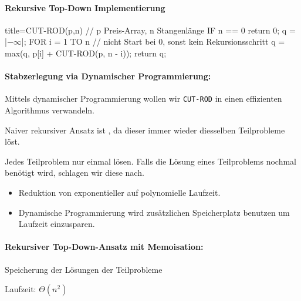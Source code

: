 \documentclass[
    ngerman,
    color=3b,
    load_common, %
    summary,
    boxarc,
]{rubos-tuda-template}
\begin{document}
\paragraph{Rekursive Top-Down Implementierung}\mbox{}

\begin{codeBlock}[autogobble,escapeinside=||]{title={CUT-ROD(p,n)    // p Preis-Array, n Stangenlänge}}
    IF n == 0
        return 0;
    q = |$-\infty$|;
    FOR i = 1 TO n  // nicht Start bei 0, sonst kein Rekursionsschritt
        q = max(q, p[i] + CUT-ROD(p, n - i));
    return q;
\end{codeBlock}
\paragraph{Stabzerlegung via Dynamischer Programmierung:}
\begin{description}[leftmargin=2cm]
    \item [Ziel]
          Mittels dynamischer Programmierung wollen wir \texttt{CUT-ROD} in einen effizienten
          Algorithmus verwandeln.
    \item [Bemerkung]
          Naiver rekursiver Ansatz ist , da dieser immer wieder diesselben
          Teilprobleme löst.
    \item [Ansatz]
          Jedes Teilproblem nur einmal lösen. Falls die Lösung eines Teilproblems nochmal benötigt
          wird, schlagen wir diese nach.
\end{description}
\begin{itemize}
    \item Reduktion von exponentieller auf polynomielle Laufzeit.
    \item Dynamische Programmierung wird zusätzlichen Speicherplatz benutzen um Laufzeit einzusparen.
\end{itemize}
\paragraph{Rekursiver Top-Down-Ansatz mit Memoisation:}\mbox{}
\begin{idea}\mbox{}
    Speicherung der Lösungen der Teilprobleme
\end{idea}
Laufzeit: $\Theta(n^2)$
\end{document}
